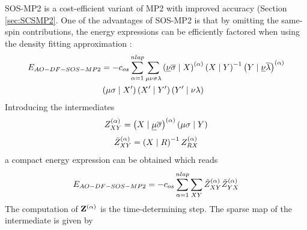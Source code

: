 SOS-MP2 is a cost-efficient variant of MP2 with improved  accuracy (Section \ref{sec:SCSMP2}. One of the advantages of SOS-MP2 is that by omitting the same-spin contributions, the energy expressions can be efficiently factored when using the density fitting approximation \cite{Mau2014,Gla2020}: 
\begin{equation}
\begin{split}
E_{AO-DF-SOS-MP2} &= - c_{os} \sum^{nlap}_{\alpha=1} \sum_{\mu\nu\sigma\lambda} \left( \underline{\nu}\overline{\sigma} \mid X \right)^{(\alpha)} \left( X \mid Y \right)^{-1} \left( Y \mid \underline{\nu}\overline{\lambda} \right)^{(\alpha)} \\
& \left( \mu\sigma \mid X' \right) \left( X' \mid Y' \right) \left( Y' \mid \nu\lambda \right)
\end{split}
\end{equation}
\noindent Introducing the intermediates
\begin{equation}
Z^{(\alpha)}_{XY} = \left( X \mid \underline{\mu}\overline{\sigma} \right)^{(\alpha)} \left( \mu\sigma \mid Y \right)
\end{equation}
\begin{equation}
\tilde{Z}^{(\alpha)}_{XY} = \left( X \mid R \right)^{-1} Z^{(\alpha)}_{RX}
\end{equation}
\noindent a compact energy expression can be obtained which reads
\begin{equation}
E_{AO-DF-SOS-MP2} = - c_{os} \sum^{nlap}_{\alpha=1} \sum_{XY} \tilde{Z}^{(\alpha)}_{XY} \tilde{Z}^{(\alpha)}_{YX} 
\end{equation}
\noindent The computation of $\mathbf{Z}^{(\alpha)}$ is the time-determining step. The sparse map of the intermediate is given by 
\begin{center}
\end{center}
